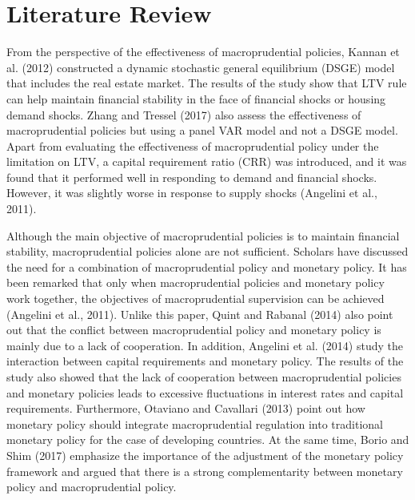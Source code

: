 \documentclass[final,3p,times,twocolumn]{elsarticle}
\begin{document}
\section{Literature Review}

From the perspective of the effectiveness of macroprudential policies, Kannan et al. (2012) constructed a dynamic stochastic general equilibrium (DSGE) model that includes the real estate market. The results of the study show that LTV rule can help maintain financial stability in the face of financial shocks or housing demand shocks. Zhang and Tressel (2017) also assess the effectiveness of macroprudential policies but using a panel VAR model and not a DSGE model. Apart from evaluating the effectiveness of macroprudential policy under the limitation on LTV, a capital requirement ratio (CRR) was introduced, and it was found that it performed well in responding to demand and financial shocks. However, it was slightly worse in response to supply shocks (Angelini et al., 2011).\par

Although the main objective of macroprudential policies is to maintain financial stability, macroprudential policies alone are not sufficient. Scholars have discussed the need for a combination of macroprudential policy and monetary policy. It has been remarked that only when macroprudential policies and monetary policy work together, the objectives of macroprudential supervision can be achieved (Angelini et al., 2011). Unlike this paper, Quint and Rabanal (2014) also point out that the conflict between macroprudential policy and monetary policy is mainly due to a lack of cooperation. In addition, Angelini et al. (2014) study the interaction between capital requirements and monetary policy. The results of the study also showed that the lack of cooperation between macroprudential policies and monetary policies leads to excessive fluctuations in interest rates and capital requirements. Furthermore, Otaviano and Cavallari (2013) point out how monetary policy should integrate macroprudential regulation into traditional monetary policy for the case of developing countries. At the same time, Borio and Shim (2017) emphasize the importance of the adjustment of the monetary policy framework and argued that there is a strong complementarity between monetary policy and macroprudential policy.\par
\end{document}

